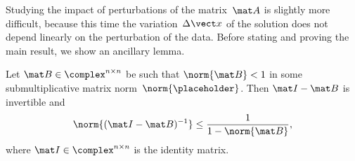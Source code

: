 Studying the impact of perturbations of the matrix~$\mat A$ is slightly more difficult,
because this time the variation~$\Delta \vect x$ of the solution does not depend linearly on the perturbation of the data.
Before stating and proving the main result,
we show an ancillary lemma.
\begin{lemma}
    \label{lemma:linear_inverse_neumann}
    Let $\mat B \in \complex^{n \times n}$ be such that $\norm{\mat B} < 1$ in some submultiplicative matrix norm~$\norm{\placeholder}$.
    Then $\mat I - \mat B$ is invertible and
    \begin{equation}
        \label{eq:linear_bound_inverse_perturbation_identity}
        \norm{(\mat I - \mat B)^{-1}}
        \leq \frac{1}{1 - \norm{\mat B}},
    \end{equation}
    where $\mat I \in \complex^{n \times n}$ is the identity matrix.
\end{lemma}

